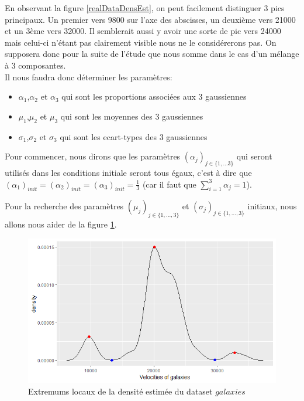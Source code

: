 \documentclass[a4paper,french,10pt]{article}
\begin{document}
En observant la figure \ref{realDataDensEst}, on peut facilement distinguer 3 pics principaux. Un premier vers 9800 sur l'axe des abscisses, un deuxième vers 21000 et un 3ème vers 32000. Il semblerait aussi y avoir une sorte de pic vers 24000 mais celui-ci n'étant pas clairement visible nous ne le considérerons pas. On supposera donc pour la suite de l'étude que nous somme dans le cas d'un mélange à 3 composantes. \\
Il nous faudra donc déterminer les paramètres:
\begin{itemize}
	\item $\alpha_1$,$\alpha_2$ et $\alpha_3$ qui sont les proportions associées aux 3 gaussiennes
	\item $\mu_1$,$\mu_2$ et $\mu_3$ qui sont les moyennes des 3 gaussiennes
	\item $\sigma_1$,$\sigma_2$ et $\sigma_3$ qui sont les ecart-types des 3 gaussiennes
\end{itemize}
Pour commencer, nous dirons que les paramètres $(\alpha_{j})_{j \in \{1,\dots3\}}$ qui seront utilisés dans les conditions initiale seront tous égaux, c'est à dire que $(\alpha_1)_{init} = (\alpha_2)_{init} = (\alpha_3)_{init} = \frac{1}{3}$ (car il faut que $\sum_{i=1}^{3} \alpha_j = 1$).

\vspace{2mm}

Pour la recherche des paramètres $(\mu_j)_{j \in \{1,\dots,3\}}$ et $(\sigma_j)_{j \in \{1, \dots, 3\}}$ initiaux, nous allons nous aider de la figure \ref{extremumLoc}.

\begin{figure}[htp] 
	\centering
	\includegraphics[scale=0.6]{images/extremumLoc.png}
	\caption{Extremums locaux de la densité estimée du dataset $galaxies$}
	\label{extremumLoc}
\end{figure}
\end{document}
